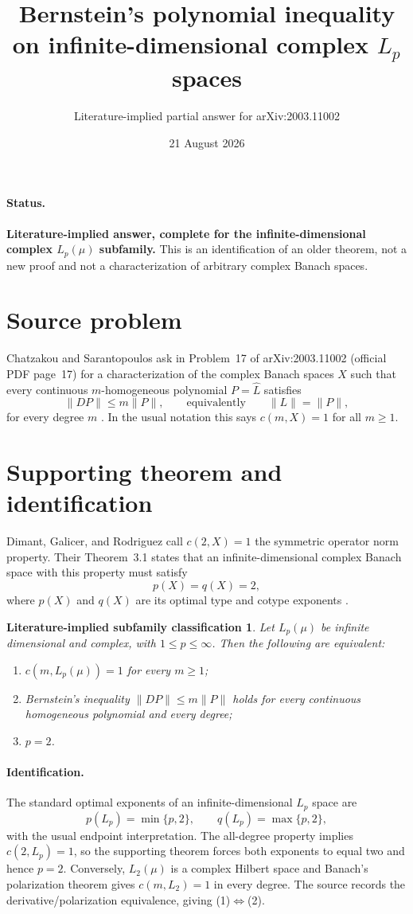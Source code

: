 \documentclass[11pt]{article}
\title{Bernstein's polynomial inequality on infinite-dimensional complex
$L_p$ spaces}
\author{Literature-implied partial answer for arXiv:2003.11002}
\date{21 August 2026}
\newtheorem*{theorem}{Literature-implied subfamily classification}
\begin{document}
\maketitle

\paragraph{Status.}
\textbf{Literature-implied answer, complete for the infinite-dimensional
complex $L_p(\mu)$ subfamily.}  This is an identification of an older theorem,
not a new proof and not a characterization of arbitrary complex Banach spaces.

\section*{Source problem}
Chatzakou and Sarantopoulos ask in Problem~17 of arXiv:2003.11002 (official
PDF page~17) for a characterization of the complex Banach spaces $X$ such
that every continuous $m$-homogeneous polynomial $P=\widehat L$ satisfies
\[
              \|DP\|\le m\|P\|,
              \qquad\text{equivalently}\qquad
              \|L\|=\|P\|,
\]
for every degree $m$ \cite{CS}.  In the usual notation this says
$c(m,X)=1$ for all $m\ge1$.

\section*{Supporting theorem and identification}
Dimant, Galicer, and Rodriguez call $c(2,X)=1$ the symmetric operator norm
property.  Their Theorem~3.1 states that an infinite-dimensional complex
Banach space with this property must satisfy
\[
                         p(X)=q(X)=2,
\]
where $p(X)$ and $q(X)$ are its optimal type and cotype exponents
\cite[Theorem~3.1]{DGR}.

\begin{theorem}
Let $L_p(\mu)$ be infinite dimensional and complex, with $1\le p\le\infty$.
Then the following are equivalent:
\begin{enumerate}
\item $c(m,L_p(\mu))=1$ for every $m\ge1$;
\item Bernstein's inequality $\|DP\|\le m\|P\|$ holds for every continuous
      homogeneous polynomial and every degree;
\item $p=2$.
\end{enumerate}
\end{theorem}

\paragraph{Identification.}
The standard optimal exponents of an infinite-dimensional $L_p$ space are
\[
                 p(L_p)=\min\{p,2\},\qquad
                 q(L_p)=\max\{p,2\},
\]
with the usual endpoint interpretation.  The all-degree property implies
$c(2,L_p)=1$, so the supporting theorem forces both exponents to equal two
and hence $p=2$.  Conversely, $L_2(\mu)$ is a complex Hilbert space and
Banach's polarization theorem gives $c(m,L_2)=1$ in every degree.  The source
records the derivative/polarization equivalence, giving (1)$\Leftrightarrow$(2).
\end{document}
